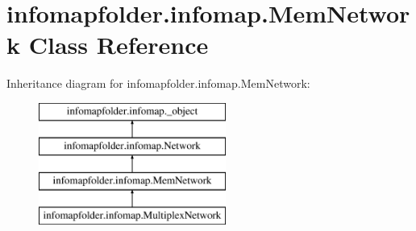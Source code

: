 \hypertarget{classinfomapfolder_1_1infomap_1_1MemNetwork}{}\section{infomapfolder.\+infomap.\+Mem\+Network Class Reference}
\label{classinfomapfolder_1_1infomap_1_1MemNetwork}
Inheritance diagram for infomapfolder.\+infomap.\+Mem\+Network\+:\begin{figure}[H]
\begin{center}
\leavevmode
\includegraphics[height=4.000000cm]{classinfomapfolder_1_1infomap_1_1MemNetwork}
\end{center}
\end{figure}
